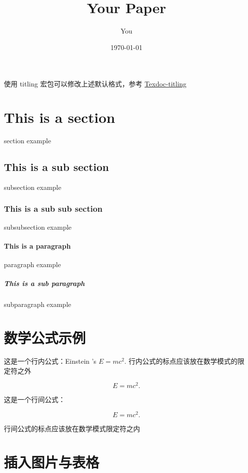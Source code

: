 \documentclass[UTF8]{ctexart}
\title{Your Paper}
\author{You}
\date{\today}
\begin{document}
    \maketitle  %
    使用 titling 宏包可以修改上述默认格式，参考 \href{https://texdoc.org/serve/titling.pdf/0}{Texdoc-titling}

    \tableofcontents

    \section{This is a section}
    section example

    \subsection{This is a sub section}
    subsection example

    \subsubsection{This is a sub sub section}
    subsubsection example

    \paragraph{This is a paragraph}
    paragraph example

    \subparagraph{This is a sub paragraph}
    subparagraph example

    \section{数学公式示例}

    这是一个行内公式：Einstein 's $E=mc^2$. 行内公式的标点应该放在数学模式的限定符之外

    \[ E=mc^2. \]

    这是一个行间公式：

    \begin{equation}
    E=mc^2.
    \end{equation}

    行间公式的标点应该放在数学模式限定符之内

    \section{插入图片与表格}
\end{document}
